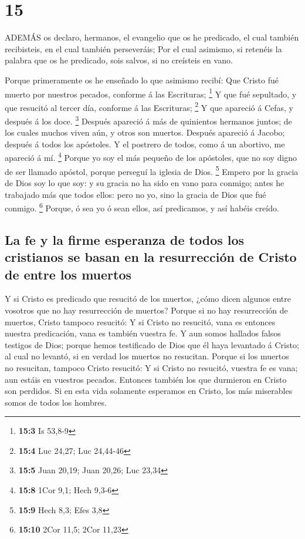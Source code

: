 \hypertarget{section-14}{%
\section{15}\label{section-14}}

 ADEMÁS os declaro, hermanos, el evangelio que os he
predicado, el cual también recibisteis, en el cual también perseveráis;
 Por el cual asimismo, si retenéis la palabra que os he
predicado, sois salvos, si no creísteis en vano.

 Porque primeramente os he enseñado lo que asimismo recibí:
Que Cristo fué muerto por nuestros pecados, conforme á las Escrituras;
\footnote{\textbf{15:3} Is 53,8-9}  Y que fué sepultado, y
que resucitó al tercer día, conforme á las Escrituras; \footnote{\textbf{15:4}
  Luc 24,27; Luc 24,44-46}  Y que apareció á Cefas, y
después á los doce. \footnote{\textbf{15:5} Juan 20,19; Juan 20,26; Luc
  23,34}  Después apareció á más de quinientos hermanos
juntos; de los cuales muchos viven aún, y otros son muertos.
 Después apareció á Jacobo; después á todos los apóstoles.
 Y el postrero de todos, como á un abortivo, me apareció á
mí. \footnote{\textbf{15:8} 1Cor 9,1; Hech 9,3-6}  Porque yo
soy el más pequeño de los apóstoles, que no soy digno de ser llamado
apóstol, porque perseguí la iglesia de Dios. \footnote{\textbf{15:9}
  Hech 8,3; Efes 3,8}  Empero por la gracia de Dios soy lo
que soy: y su gracia no ha sido en vano para conmigo; antes he trabajado
más que todos ellos: pero no yo, sino la gracia de Dios que fué conmigo.
\footnote{\textbf{15:10} 2Cor 11,5; 2Cor 11,23}  Porque, ó
sea yo ó sean ellos, así predicamos, y así habéis creído.

\hypertarget{la-fe-y-la-firme-esperanza-de-todos-los-cristianos-se-basan-en-la-resurrecciuxf3n-de-cristo-de-entre-los-muertos}{%
\subsection{La fe y la firme esperanza de todos los cristianos se basan
en la resurrección de Cristo de entre los
muertos}\label{la-fe-y-la-firme-esperanza-de-todos-los-cristianos-se-basan-en-la-resurrecciuxf3n-de-cristo-de-entre-los-muertos}}

 Y si Cristo es predicado que resucitó de los muertos,
¿cómo dicen algunos entre vosotros que no hay resurrección de muertos?
 Porque si no hay resurrección de muertos, Cristo tampoco
resucitó:  Y si Cristo no resucitó, vana es entonces
nuestra predicación, vana es también vuestra fe.  Y aun
somos hallados falsos testigos de Dios; porque hemos testificado de Dios
que él haya levantado á Cristo; al cual no levantó, si en verdad los
muertos no resucitan.  Porque si los muertos no resucitan,
tampoco Cristo resucitó:  Y si Cristo no resucitó, vuestra
fe es vana; aun estáis en vuestros pecados.  Entonces
también los que durmieron en Cristo son perdidos.  Si en
esta vida solamente esperamos en Cristo, los más miserables somos de
todos los hombres.

